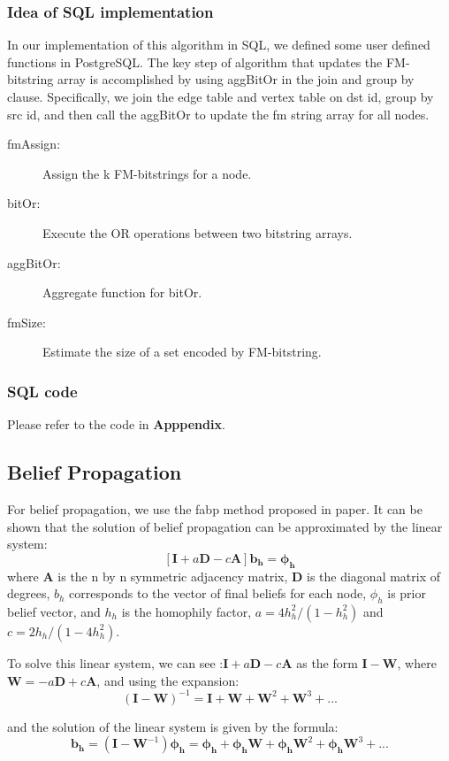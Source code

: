 \subsubsection{Idea of SQL implementation}
In our implementation of this algorithm in SQL, we defined some user defined functions in PostgreSQL. The key step of algorithm that updates the FM-bitstring array is accomplished by using aggBitOr in the join and group by clause. Specifically, we join the edge table and vertex table on dst id, group by src id, and then call the aggBitOr to update the fm string array for all nodes.
\begin{description}
  \item[fmAssign:] Assign the k FM-bitstrings for a node.
  \item[bitOr:] Execute the OR operations between two bitstring arrays.
  \item[aggBitOr:] Aggregate function for bitOr.
  \item[fmSize:] Estimate the size of a set encoded by FM-bitstring.
\end{description}

\subsubsection{SQL code}
Please refer to the code in {\bf Apppendix}.


\subsection{Belief Propagation}
For belief propagation, we use the fabp method proposed in paper\cite{DBLP:conf/pkdd/KoutraKKCPF11}.
It can be shown that the solution of belief propagation can be approximated by the linear system:$$[\mathbf{I}	 + a\mathbf{D} - c\mathbf{A}]\mathbf{b_h} = \mathbf{\phi_h}$$ 
where $\mathbf{A}$ is the n by n symmetric adjacency matrix, $\mathbf{D}$ is the diagonal matrix of degrees, $b_h$ corresponds to the vector of final beliefs for each node, $\phi_h$ is prior belief vector, and $h_h$ is the homophily factor,  $a = 4h_h^2/(1 - h_h^2)$ and $c = 2h_h / (1-4h_h^2)$.

To solve this linear system, we can see :$\mathbf{I} + a\mathbf{D} - c\mathbf{A}$ as the form $\mathbf{I} - \mathbf{W}$, where $\mathbf{W} = -a\mathbf{D} + c\mathbf{A}$, and using the expansion:$$(\mathbf{I} - \mathbf{W})^{-1} = \mathbf{I} + \mathbf{W} + \mathbf{W}^2 + \mathbf{W}^3 + ...$$

and the solution of the linear system is given by the formula:
$$\mathbf{b_h} = (\mathbf{I} - \mathbf{W}^{-1})\mathbf{\phi_h} =\mathbf{\phi_h}  + \mathbf{\phi_h} \mathbf{W} + \mathbf{\phi_h} \mathbf{W}^2 + \mathbf{\phi_h} \mathbf{W}^3 + ...$$

